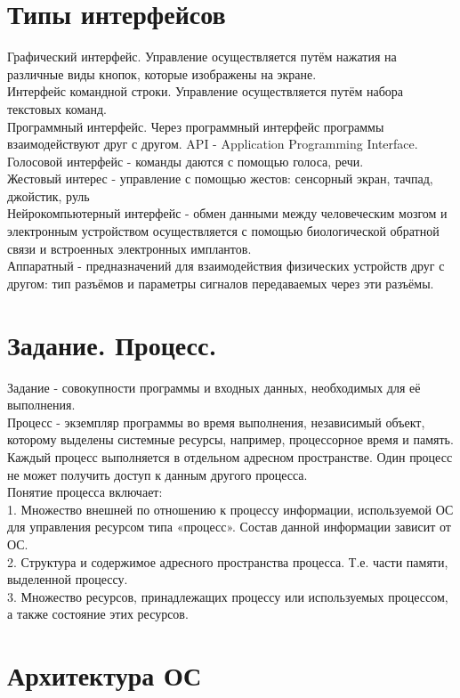 \documentclass[a4paper]{article}
\begin{document}
\section*{Типы интерфейсов}
Графический интерфейс. Управление осуществляется путём нажатия на различные виды кнопок, которые изображены на экране. \\
Интерфейс командной строки. Управление осуществляется путём набора текстовых команд.\\
Программный интерфейс. Через программный интерфейс программы взаимодействуют друг с другом. API - Application Programming Interface.\\
Голосовой интерфейс - команды даются с помощью голоса, речи.\\
Жестовый интерес - управление с помощью жестов: сенсорный экран, тачпад, джойстик, руль \\
Нейрокомпьютерный интерфейс - обмен данными между человеческим мозгом и электронным устройством осуществляется с помощью биологической обратной связи и встроенных электронных имплантов.\\
Аппаратный - предназначений для взаимодействия физических устройств друг с другом: тип разъёмов и параметры сигналов передаваемых через эти разъёмы.\\
\section*{Задание. Процесс.}
Задание - совокупности программы и входных данных, необходимых для её выполнения. \\
Процесс - экземпляр программы во время выполнения, независимый объект, которому выделены системные ресурсы, например, процессорное время и память. Каждый процесс выполняется в отдельном адресном пространстве. Один процесс не может получить доступ к данным другого процесса.\\
Понятие процесса включает:\\
1. Множество внешней по отношению к процессу информации, используемой ОС для управления ресурсом типа «процесс». Состав данной информации зависит от ОС.\\
2. Структура и содержимое адресного пространства процесса. Т.е. части памяти, выделенной процессу.\\
3. Множество ресурсов, принадлежащих процессу или используемых процессом, а также состояние этих ресурсов.\\
\section{Архитектура ОС}
\setcounter{section}{1}
\end{document}
